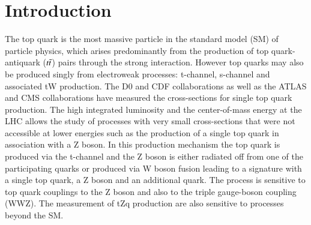 
\chapter{Introduction}
\label{sec:intro}
The top quark is the most massive particle in the standard model (SM) of particle physics, which arises predominantly from the production of top quark-antiquark ($t\Bar{t}$) pairs through the strong interaction. However top quarks may also be produced singly from electroweak processes: t-channel, s-channel and associated tW production. The D0 and CDF collaborations \cite{PhysRevLett.103.092001,PhysRevLett.103.092002} as well as the ATLAS \cite{ATLAS:2012byx} and CMS \cite{PhysRevLeCMS} collaborations have measured the cross-sections for single top quark production. The high integrated luminosity and the center-of-mass energy at the LHC allows the study of processes with very small cross-sections that were not accessible at lower energies such as the production of a single top quark in association with a Z boson. In this production mechanism the top quark is produced via the t-channel and the Z boson is either radiated off from one of the participating quarks or produced via W boson fusion leading to a signature with a single top quark, a Z boson and an additional quark. The process is sensitive to top quark couplings to the Z boson and also to the triple gauge-boson coupling (WWZ). The measurement of tZq production are also sensitive to processes beyond the SM.

